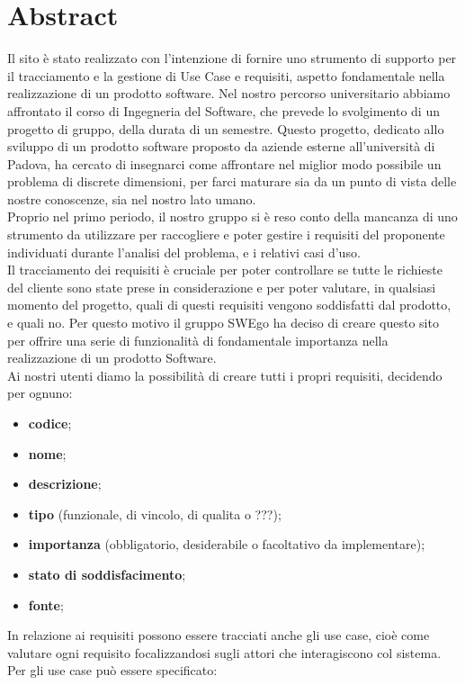 \section{Abstract}
Il sito è stato realizzato con l'intenzione di fornire uno strumento di supporto per il tracciamento e la gestione di Use Case e requisiti, aspetto fondamentale nella realizzazione di un prodotto software.
Nel nostro percorso universitario abbiamo affrontato il corso di Ingegneria del Software, che prevede lo svolgimento di un progetto di gruppo, della durata di un semestre. Questo progetto, dedicato allo sviluppo di un prodotto software proposto da   aziende esterne all'università di Padova, ha cercato di insegnarci come affrontare nel miglior modo possibile un problema di discrete dimensioni, per farci maturare sia da un punto di vista delle nostre conoscenze, sia nel nostro lato umano. \\
Proprio nel primo periodo, il nostro gruppo si è reso conto della mancanza di uno strumento da utilizzare per raccogliere e poter gestire i requisiti del proponente individuati durante l'analisi del problema, e i relativi casi d'uso. \\
Il tracciamento dei requisiti è cruciale per poter controllare se tutte le richieste del cliente sono state prese in considerazione e per poter valutare, in qualsiasi momento del progetto, quali di questi requisiti vengono soddisfatti dal prodotto, e quali no. Per questo motivo il gruppo SWEgo ha deciso di creare questo sito per offrire una serie di funzionalità di fondamentale importanza nella realizzazione di un prodotto Software. \\
Ai nostri utenti diamo la possibilità di creare tutti i propri requisiti, decidendo per ognuno:
\begin{itemize}
	\item \textbf{codice};
	\item \textbf{nome};
	\item \textbf{descrizione};
	\item \textbf{tipo} (funzionale, di vincolo, di qualita o ???);
	\item \textbf{importanza} (obbligatorio, desiderabile o facoltativo da implementare);
	\item \textbf{stato di soddisfacimento};
	\item \textbf{fonte};
\end{itemize}
In relazione ai requisiti possono essere tracciati anche gli use case, cioè come valutare ogni requisito focalizzandosi sugli attori che interagiscono col sistema. Per gli use case può essere specificato:
